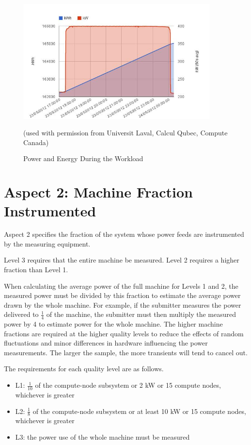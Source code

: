 \begin{figure}
\centering
\includegraphics[width=4in]{fig3-6}
\caption{Power and Energy During the Workload}
(used with permission from Universit Laval, Calcul Qubec, Compute Canada)
\label{fig:powengwl}
\end{figure}

\section{Aspect 2: Machine Fraction Instrumented}
\label{sec:A2MFI}
\noindent
Aspect 2 specifies the fraction of the system whose power feeds are instrumented by the measuring equipment. 
\wl

\noindent
Level 3 requires that the entire machine be measured. Level 2 requires a higher fraction than Level 1.
\wl

\noindent
When calculating the average power of the full machine for Levels 1 and 2, the measured power must be divided by this fraction to 
estimate the average power drawn by the whole machine. For example, if the submitter measures the power delivered 
to $ \frac{1}{4} $ of the machine, the submitter must then multiply the measured power by 4 to estimate power for the whole machine.  
The higher machine fractions are required at the higher quality levels to reduce the effects of random fluctuations and minor differences in hardware influencing the power measurements.  The larger the sample, the more transients will tend to cancel out.
\wl

\noindent
The requirements for each quality level are as follows.

\begin{itemize}
\item
L1: $ \frac{1}{10} $ of the compute-node subsystem or 2 kW or 15 compute nodes, whichever is greater
\item
L2: $ \frac{1}{8} $ of the compute-node subsystem or at least 10 kW or 15 compute nodes, whichever is greater
\item
L3: the power use of the whole machine must be measured
\end{itemize}

